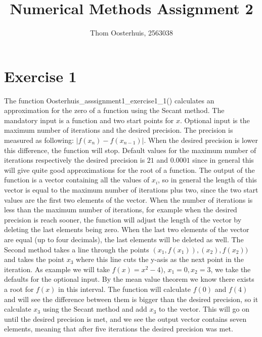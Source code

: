\documentclass[10pt]{article}
\begin{document}
 
 
\title{Numerical Methods Assignment 2}
\author{Thom Oosterhuis, 2563038}
\maketitle
 
\section{Exercise 1}
The function Oosterhuis\_asssignment1\_exercise1\_1() calculates an approximation for the zero of a function using the Secant method. The mandatory input is a function and two start points for $x$. Optional input is the maximum number of iterations and the desired precision. The precision is measured as following: $\left| f(x_n)-f(x_{n-1}) \right|$. When the desired precision is lower this difference, the function will stop. Default values for the maximum number of iterations respectively the desired precision is $21$ and $0.0001$ since in general this will give quite good approximations for the root of a function.
The output of the function is a vector containing all the values of $x_i$, so in general the length of this vector is equal to the maximum number of iterations plus two, since the two start values are the first two elements of the vector. When the number of iterations is less than the maximum number of iterations, for example when the desired precision is reach sooner, the function will adjust the length of the vector by deleting the last elements being zero. When the last two elements of the vector are equal (up to four decimals), the last elements will be deleted as well.
The Second method takes a line through the points $(x_1,f(x_1)),(x_2),f(x_2))$ and takes the point  $x_3$  where this line cuts the y-asis as the next point in the iteration.
As example we will take $f(x)=x^2-4)$, $x_1 = 0, x_2=3$, we take the defaults for the optional input. By the mean value theorem we know there exists a root for $f(x)$ in this interval. The function will calculate $f(0)$ and $f(4)$ and will see the difference between them is bigger than the desired precision, so it calculate $x_3$ using the Secant method and add $x_3$ to the vector. This will go on until the desired precision is met, and we see the output vector contains seven elements, meaning that after five iterations the desired precision was met.
\end{document}
